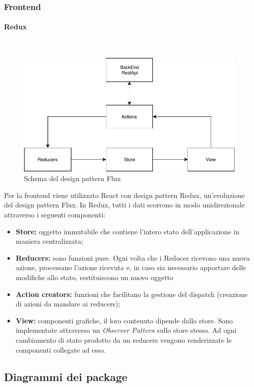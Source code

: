 \subsubsection{Frontend}
\paragraph{Redux}\mbox{}\\

\begin{figure}[H]
    \centering
	\includegraphics[width=0.7\linewidth]{img/Flux.pdf}
	\caption{Schema del design pattern Flux}
\end{figure}

Per la frontend viene utilizzato React con design pattern Redux, un'evoluzione del design pattern Flux.
In Redux, tutti i dati scorrono in modo unidirezionale attraverso i seguenti componenti:
\begin{itemize}
    \item \textbf{Store: }oggetto immutabile che contiene l'intero stato dell'applicazione in maniera centralizzata;
    \item \textbf{Reducers: }sono funzioni pure. Ogni volta che i Reducer ricevono una nuova azione, 
    processano l'azione ricevuta e, in caso sia necessario apportare delle modifiche allo stato, restituiscono un nuovo oggetto 
    \item \textbf{Action creators: }funzioni che facilitano la gestione del dispatch (creazione di azioni da mandare ai reducers); 
    \item \textbf{View: }componenti grafiche, il loro contenuto dipende dallo store. Sono implementate attraverso un \textit{Observer Pattern} sullo store stesso.
    Ad ogni cambiamento di stato prodotto da un reducers vengono renderizzate le componenti collegate ad esso.
\end{itemize} 


\subsection{Diagrammi dei package}
